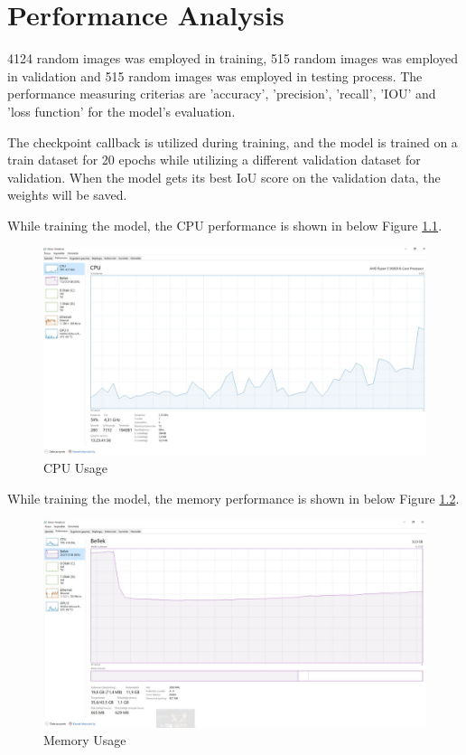 \chapter{Performance Analysis}
4124 random images was employed in training, 515 random images was employed in validation and 515 random images was employed in testing process. The performance measuring criterias are 'accuracy', 'precision', 'recall', 'IOU' and 'loss function' for the model's evaluation. 

The checkpoint callback is utilized during training, and the model is trained on a train dataset for 20 epochs while utilizing a different validation dataset  for validation. When the model gets its best IoU score on the validation data, the weights will be saved.

While training the model, the CPU performance is shown in below Figure \ref{performance_cpu}. 
\begin{figure}[htp]
    \centering
    \includegraphics[width=16cm]{projectChapters/images/performance_cpu.jpeg}
    \caption{CPU Usage}
    \label{performance_cpu}
\end{figure}

\newpage
While training the model, the memory performance is shown in below Figure \ref{performance_memory}. 
\begin{figure}[htp]
    \centering
    \includegraphics[width=15cm]{projectChapters/images/performance_memory.jpeg}
    \caption{Memory Usage}
    \label{performance_memory}
\end{figure}

